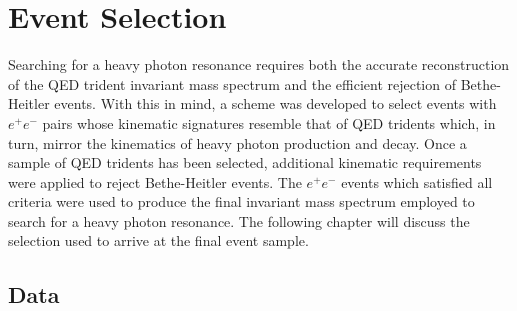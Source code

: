 %
%
%
%
\chapter{Event Selection}

Searching for a heavy photon resonance requires both the accurate 
reconstruction of the QED trident invariant mass spectrum and the efficient 
rejection of Bethe-Heitler events.  With this in mind, a scheme 
was developed to select events with $e^+e^-$ pairs whose kinematic signatures
resemble that of QED tridents which, in turn, mirror the kinematics of 
heavy photon production and decay.  Once a sample of QED tridents has been selected, 
additional kinematic 
requirements were applied to reject Bethe-Heitler events.  The  $e^+e^-$ events
which satisfied all criteria were used to produce the final invariant mass 
spectrum employed to search for a heavy photon resonance.  The following chapter
will discuss the selection used to arrive at the final event sample.   

\section{Data}

